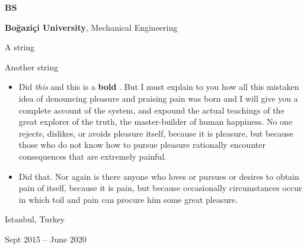 \documentclass[10pt, letterpaper]{article}
\newenvironment{summary}{
    \begin{description}[
        topsep=0.10 cm,
        parsep=0.10 cm,
        partopsep=0pt,
        itemsep=0pt,
        leftmargin=0.4 cm + 10pt
    ]
}{
    \end{description}
} %
\newenvironment{highlights}{
    \begin{itemize}[
        topsep=0.10 cm,
        parsep=0.10 cm,
        partopsep=0pt,
        itemsep=0pt,
        leftmargin=0.4 cm + 10pt
    ]
}{
    \end{itemize}
} %
\newenvironment{threecolentry}[3][]{
    \onecolentry
    \def\thirdColumn{#3}
    \setcolumnwidth{1 cm, \fill, 4.5 cm}
    \begin{paracol}{3}
    {\raggedright #2} \switchcolumn
}{
    \switchcolumn \raggedleft \thirdColumn
    \end{paracol}
    \endonecolentry
} %
\let\hrefWithoutArrow\href
\renewcommand{\href}[2]{\hrefWithoutArrow{#1}{\ifthenelse{\equal{#2}{}}{ }{#2 }\raisebox{.15ex}{\footnotesize \faExternalLink*}}}
\begin{document}
        \vspace{0.2 cm}

        \begin{threecolentry}{\textbf{BS}}{
            Istanbul, Turkey

        Sept 2015 – June 2020
        }
            \textbf{Boğaziçi University}, Mechanical Engineering
            \begin{summary}
                \item A string
                \item Another string
            \end{summary}
            \begin{highlights}
                \item Did \textit{this} and this is a \textbf{bold} \href{https://example.com}{link}. But I must explain to you how all this mistaken idea of denouncing pleasure and praising pain was born and I will give you a complete account of the system, and expound the actual teachings of the great explorer of the truth, the master-builder of human happiness. No one rejects, dislikes, or avoids pleasure itself, because it is pleasure, but because those who do not know how to pursue pleasure rationally encounter consequences that are extremely painful.
                \item Did that. Nor again is there anyone who loves or pursues or desires to obtain pain of itself, because it is pain, but because occasionally circumstances occur in which toil and pain can procure him some great pleasure.
            \end{highlights}
        \end{threecolentry}

        \vspace{0.2 cm}
\end{document}
